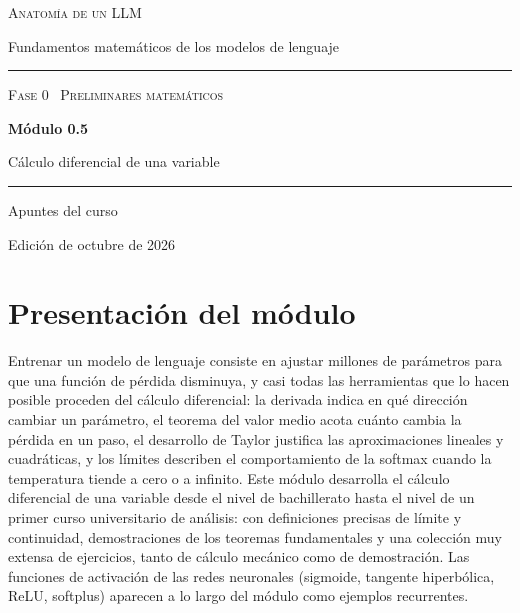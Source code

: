 \documentclass[11pt,a4paper,twoside,openany]{book}
\begin{document}
\frontmatter
\begin{titlepage}
\centering
\vspace*{2.5cm}
{\large\scshape Anatomía de un LLM}\par
\vspace{0.4cm}
{\normalsize Fundamentos matemáticos de los modelos de lenguaje}\par
\vspace{2.2cm}
\rule{\textwidth}{0.8pt}\par\vspace{0.5cm}
{\small\scshape Fase 0 \textperiodcentered\ Preliminares matemáticos}\par\vspace{0.3cm}
{\Huge\bfseries Módulo 0.5\par}\vspace{0.3cm}
{\LARGE Cálculo diferencial de una variable\par}
\vspace{0.5cm}\rule{\textwidth}{0.4pt}\par
\vspace{1.6cm}
{\large Apuntes del curso}\par
\vfill
{\small Edición de octubre de 2026}\par
\end{titlepage}

\chapter*{Presentación del módulo}

Entrenar un modelo de lenguaje consiste en ajustar millones de parámetros para que una función de pérdida disminuya, y casi todas las herramientas que lo hacen posible proceden del cálculo diferencial: la derivada indica en qué dirección cambiar un parámetro, el teorema del valor medio acota cuánto cambia la pérdida en un paso, el desarrollo de Taylor justifica las aproximaciones lineales y cuadráticas, y los límites describen el comportamiento de la softmax cuando la temperatura tiende a cero o a infinito. Este módulo desarrolla el cálculo diferencial de una variable desde el nivel de bachillerato hasta el nivel de un primer curso universitario de análisis: con definiciones precisas de límite y continuidad, demostraciones de los teoremas fundamentales y una colección muy extensa de ejercicios, tanto de cálculo mecánico como de demostración. Las funciones de activación de las redes neuronales (sigmoide, tangente hiperbólica, ReLU, softplus) aparecen a lo largo del módulo como ejemplos recurrentes.
\end{document}
